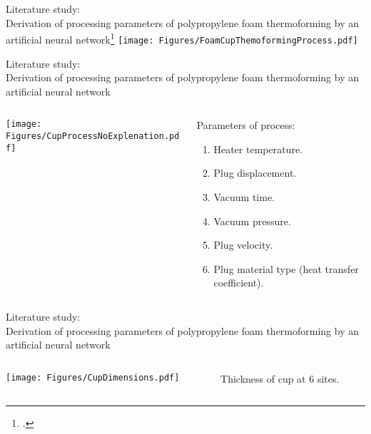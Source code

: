 \documentclass{beamer}
\begin{document}
	\begin{frame}{Literature study:\\Derivation of processing parameters of polypropylene foam thermoforming by an artificial neural network\footcite{https://doi.org/10.1002/pen.20287}}
		\centering
		\texttt{[image: Figures/FoamCupThemoformingProcess.pdf]}
	\end{frame}

	\begin{frame}{Literature study:\\Derivation of processing parameters of polypropylene foam thermoforming by an artificial neural network}
		\begin{columns}
			\begin{column}{0.5\textwidth}
				\begin{center}
					\texttt{[image: Figures/CupProcessNoExplenation.pdf]}
				\end{center}
			\end{column}
			\begin{column}{0.5\textwidth}  %
				Parameters of process:
				\begin{enumerate}
					\item Heater temperature.
					\item Plug displacement.
					\item Vacuum time.
					\item Vacuum pressure.
					\item Plug velocity.
					\item Plug material type (heat transfer coefficient).
				\end{enumerate}
			\end{column}
		\end{columns}
	\end{frame}

	\begin{frame}{Literature study:\\Derivation of processing parameters of polypropylene foam thermoforming by an artificial neural network}
		\begin{columns}
			\begin{column}{0.5\textwidth}
				\begin{center}
					\texttt{[image: Figures/CupDimensions.pdf]}
				\end{center}
			\end{column}
			\begin{column}{0.5\textwidth}  %
				Thickness of cup at 6 sites.
			\end{column}
		\end{columns}
	\end{frame}
\end{document}
